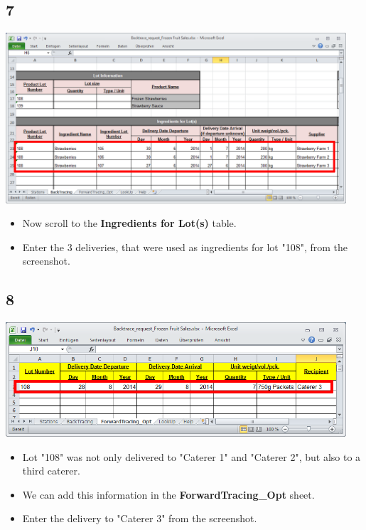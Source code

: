 \documentclass{beamer}
\begin{document}
\subsection{7}
\begin{frame}
	\begin{center}
  		\includegraphics[width=0.95\textwidth]{7.png}
	\end{center}
	\begin{itemize}
		\item Now scroll to the \textbf{Ingredients for Lot(s)} table.
		\item Enter the 3 deliveries, that were used as ingredients for lot "108", from the screenshot.
	\end{itemize}
\end{frame}

\subsection{8}
\begin{frame}
	\begin{center}
  		\includegraphics[width=0.95\textwidth]{8.png}
	\end{center}
	\begin{itemize}
		\item Lot "108" was not only delivered to "Caterer 1" and "Caterer 2", but also to a third caterer.
		\item We can add this information in the \textbf{ForwardTracing\_Opt} sheet.
		\item Enter the delivery to "Caterer 3" from the screenshot.
	\end{itemize}
\end{frame}
\end{document}
